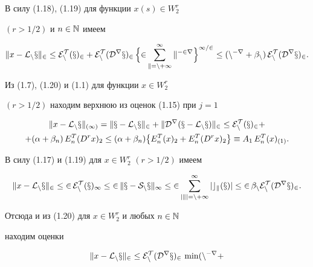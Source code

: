 \begin{pf}
В силу (1.18), (1.19) для функции $x(s)\in W_2^r$


$(r>1/2)$ и $n\in \Bbb{N}$ имеем


\begin{equation}


\|x-\cal {L}_nx\|_2 \le E_n^T(x)_2 +E_n^T(D^rx)_2\,


\Bigl\{ 2\sum_{k=n+1}^\infty k^{-2r}\Bigr\}^{1/2} \le


(n^{-r} +\beta_n)\, E_n^T(D^rx)_2.


\end{equation}





Из (1.7), (1.20) и (1.1) для функции $x\in W_2^r$


$(r>1/2)$ находим верхнюю из оценок (1.15) при $j=1$


\begin{gather*}


\|x-\cal {L}_nx\|_{(1)} =\|x-\cal{L}_nx\|_2 +


\|D^r(x-\cal{L}_nx)\|_2 \le E_n^T(x)_2 +\\


%


+ (\alpha +\beta_n)\, E_n^T(D^rx)_2 \le


(\alpha +\beta_n)\bigl\{ E_n^T(x)_2 +E_n^T(D^rx)_2\bigr\}


\equiv A_1\, E_n^T(x)_{(1)}.


\end{gather*}





В силу (1.17) и (1.19) для $x\in W_2^r$ $(r>1/2)$ имеем


\begin{equation}


\|x-\cal {L}_nx\|_2 \le 2\, E_n^T(x)_\infty \le


2\, \|x-S_nx\|_\infty \le


%


2\sum_{|k|=n+1}^\infty |c_k(x)|\le 2\, \beta_nE_n^T(D^rx)_2.


\end{equation}


Отсюда и из (1.20) для $x\in W_2^r$ и любых $n\in \Bbb{N}$


находим оценки


\begin{equation}


\|x-\cal{L}_nx\|_2 \le E_n^T(D^rx)_2\, \min (n^{-r} +



\end{equation}
\end{pf}
